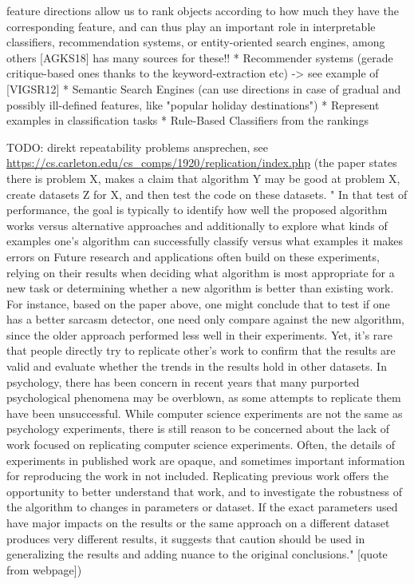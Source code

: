 \documentclass[11pt,
  paper=a4, 
  hidelinks,
  bibliography=totocnumbered,
	captions=tableheading,
	BCOR=10mm
]{scrreprt}
\theoremstyle{definition}
\begin{document}
feature directions allow us to rank objects according to how much they have the corresponding feature, and can thus play an important role in interpretable classifiers, recommendation systems, or entity-oriented search engines, among others  [AGKS18] has many sources for these!!
	* Recommender systems (gerade critique-based ones thanks to the keyword-extraction etc)
		-> see example of [VIGSR12]
	* Semantic Search Engines (can use directions in case of gradual and possibly ill-defined features, like "popular holiday destinations")
	* Represent examples in classification tasks
	* Rule-Based Classifiers from the rankings

TODO: direkt repeatability problems ansprechen, see \url{https://cs.carleton.edu/cs_comps/1920/replication/index.php} (the paper states there is problem X, makes a claim that algorithm Y may be good at problem X, create datasets Z for X, and then test the code on these datasets. " In that test of performance, the goal is typically to identify how well the proposed algorithm works versus alternative approaches and additionally to explore what kinds of examples one's algorithm can successfully classify versus what examples it makes errors on  Future research and applications often build on these experiments, relying on their results when deciding what algorithm is most appropriate for a new task or determining whether a new algorithm is better than existing work. For instance, based on the paper above, one might conclude that to test if one has a better sarcasm detector, one need only compare against the new algorithm, since the older approach performed less well in their experiments. Yet, it's rare that people directly try to replicate other's work to confirm that the results are valid and evaluate whether the trends in the results hold in other datasets. In psychology, there has been concern in recent years that many purported psychological phenomena may be overblown, as some attempts to replicate them have been unsuccessful. While computer science experiments are not the same as psychology experiments, there is still reason to be concerned about the lack of work focused on replicating computer science experiments. Often, the details of experiments in published work are opaque, and sometimes important information for reproducing the work in not included. Replicating previous work offers the opportunity to better understand that work, and to investigate the robustness of the algorithm to changes in parameters or dataset. If the exact parameters used have major impacts on the results or the same approach on a different dataset produces very different results, it suggests that caution should be used in generalizing the results and adding nuance to the original conclusions." [quote from webpage])
\end{document}
